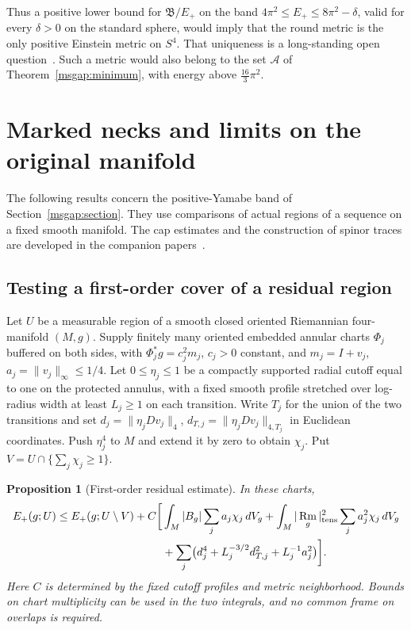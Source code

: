 \documentclass[11pt]{article}
\numberwithin{equation}{section}
\newtheorem{proposition}[theorem]{Proposition}
\theoremstyle{definition}
\theoremstyle{remark}
\DeclareMathOperator{\Rm}{Rm}
\begin{document}
Thus a positive lower bound for \(\mathfrak B/E_+\) on the band
\(4\pi^2\le E_+\le8\pi^2-\delta\), valid for every \(\delta>0\) on the
standard sphere, would imply that the round metric is the only positive
Einstein metric on \(S^4\). That uniqueness is a long-standing open
question~\cite{GurskyMalchiodi2025Mass}. Such a metric would also belong
to the set \(\mathcal A\) of Theorem~\ref{msgap:minimum}, with energy
above \(\tfrac{16}3\pi^2\).

\section{Marked necks and limits on the original manifold}\label{sec:marked-limits}

The following results concern the positive-Yamabe band of
Section~\ref{msgap:section}. They use comparisons of actual regions of
a sequence on a fixed smooth manifold. The cap estimates and the
construction of spinor traces are developed in the companion
papers~\cite{Baker2026MarkedNecks,Baker2026MarkedLimits,Baker2026DiracTransmission}.

\subsection{Testing a first-order cover of a residual region}

Let \(U\) be a measurable region of a smooth closed oriented Riemannian
four-manifold \((M,g)\). Supply finitely many oriented embedded annular
charts \(\Phi_j\) buffered on both sides, with
\(\Phi_j^*g=c_j^2m_j\), \(c_j>0\) constant, and
\(m_j=I+v_j\), \(a_j=\|v_j\|_\infty\le1/4\).
Let \(0\le\eta_j\le1\) be a compactly supported radial cutoff equal to
one on the protected annulus, with a fixed smooth profile stretched
over log-radius width at least \(L_j\ge1\) on each transition.
Write \(T_j\) for the union of the two transitions and set
\(d_j=\|\eta_j Dv_j\|_4\), \(d_{T,j}=\|\eta_j Dv_j\|_{4,T_j}\)
in Euclidean coordinates. Push \(\eta_j^4\) to \(M\) and extend it
by zero to obtain \(\chi_j\). Put \(V=U\cap\{\sum_j\chi_j\ge1\}\).

\begin{proposition}[First-order residual estimate]\label{prop:marked-cover}
In these charts,
\begin{align}
 E_+(g;U)\le E_+(g;U\setminus V)+C\bigg[
 &\int_M |B_g|\sum_j a_j\chi_j\,dV_g+
 \int_M|\Rm_g|_{\mathrm{tens}}^2\sum_j a_j^2\chi_j\,dV_g
 \notag\\
 &+\sum_j\bigl(d_j^4+L_j^{-3/2}d_{T,j}^2+L_j^{-1}a_j^2\bigr)
 \bigg].\label{eq:marked-cover}
\end{align}
Here \(C\) is determined by the fixed cutoff profiles and metric
neighborhood. Bounds on chart multiplicity can be used in the two
integrals, and no common frame on overlaps is required.
\end{proposition}
\end{document}

